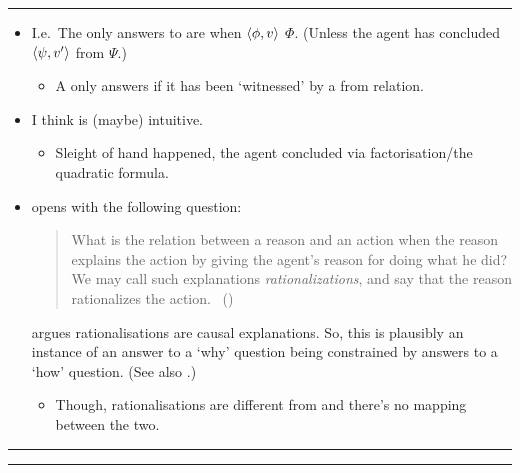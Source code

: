 \documentclass[10pt]{article}
\newcommand\lLine{{\color{gray} \noindent\rule{\textwidth}{0.4pt}}}
\newcommand\sepLine{
  \vfill
  \par\noindent\rule{\textwidth}{0.4pt}%
  \vspace{-10pt}%
  \par\noindent\rule{\textwidth}{0.4pt}
  \vfill}
\newcommand{\hand}{\ding{43}}
\begin{document}
\lLine

\begin{note}
  \begin{itemize}[noitemsep]
  \item
    I.e.\ The only answers to \qWhy{} are when \(\langle\phi, v\rangle\) \fof{} \(\Phi\). \hfill (Unless the agent has concluded \(\langle\psi, v'\rangle\) from \(\Psi\).)
    \begin{itemize}
    \item[\hand]
      A \fofr{} only answers \qWhy{} if it has been `witnessed' by a from relation.
    \end{itemize}
  \item
    I think \issueInclusion{} is (maybe) intuitive.
    \begin{itemize}
    \item
      Sleight of hand happened, the agent concluded via factorisation/the quadratic formula.
    \end{itemize}
  \item
    \citeauthor{Davidson:1963aa} opens  with the following question:

    \begin{quote}
      What is the relation between a reason and an action when the reason explains the action by giving the agent's reason for doing what he did?
      We may call such explanations \emph{rationalizations}, and say that the reason rationalizes the action.%
      \mbox{ }\hfill\mbox{(\citeyear[685]{Davidson:1963aa})}
    \end{quote}

    \citeauthor{Davidson:1963aa} argues rationalisations are causal explanations.
    So, this is plausibly an instance of an answer to a `why' question being constrained by answers to a `how' question.
    (See also \cite{Hieronymi:2011aa}.)
    \begin{itemize}
    \item
      Though, rationalisations are different from  and there's no mapping between the two.
    \end{itemize}
  \end{itemize}
\end{note}

\sepLine
\end{document}
